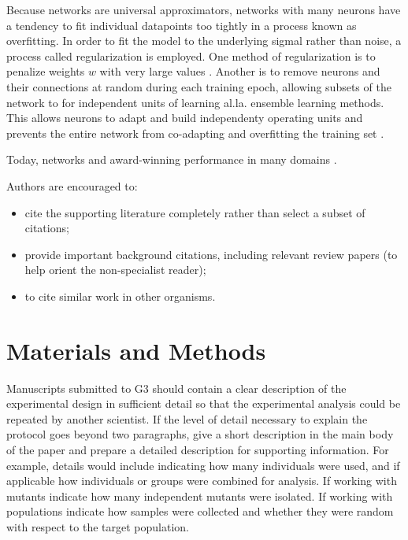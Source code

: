 \documentclass[9pt,twocolumn,twoside]{g3_article/gsag3jnl}
\begin{document}
Because networks are universal approximators, networks with many
neurons have a tendency to fit individual datapoints too tightly 
in a process known as overfitting. In order to fit the model to the underlying
sigmal rather than noise, a process called regularization is employed. One method
of regularization is to penalize weights $w$ with very large values \citep{krogh1992}. 
Another is to remove neurons and their connections at random during each training
epoch, allowing subsets of the network to for independent units of learning al.la. ensemble learning methods.  
This allows neurons to adapt and build independenty operating units and prevents the entire
network from co-adapting and overfitting the training set \citep{srivastava2014}.

Today, networks and award-winning performance in many domains \citep{schmidhuber2015}.


Authors are encouraged to:

\begin{itemize}
\item cite the supporting literature completely rather than select a subset of citations;
\item provide important background citations, including relevant review papers (to help orient the non-specialist reader);
\item to cite similar work in other organisms.
\end{itemize}

\section*{Materials and Methods}

Manuscripts submitted to G3 should contain a clear description of the experimental design in sufficient detail so that 
the experimental analysis could be repeated by another scientist. If the level of detail necessary to explain the 
protocol goes beyond two paragraphs, give a short description in the main body of the paper and prepare a detailed 
description for supporting information.  For example, details would include indicating how many individuals were used, 
and if applicable how individuals or groups were combined for analysis. If working with mutants indicate how 
many independent mutants were isolated. If working with populations indicate how samples were collected 
and whether they were random with respect to the target population.
\end{document}

